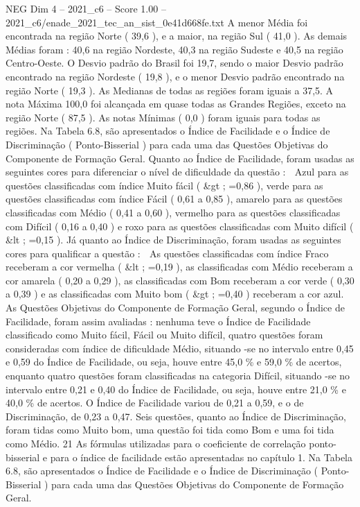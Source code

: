 \begin{textsample}{NEG Dim 4 – 2021\_c6 – Score 1.00 – 2021\_c6/enade\_2021\_tec\_an\_sist\_0e41d668fe.txt}
A menor Média foi encontrada na região Norte ( 39,6 ), e a maior, na região Sul ( 41,0 ).
As demais Médias foram : 40,6 na região Nordeste, 40,3 na região Sudeste e 40,5 na região Centro-Oeste.
O Desvio padrão do Brasil foi 19,7, sendo o maior Desvio padrão encontrado na região Nordeste ( 19,8 ), e o menor Desvio padrão encontrado na região Norte ( 19,3 ).
As Medianas de todas as regiões foram iguais a 37,5.
A nota Máxima 100,0 foi alcançada em quase todas as Grandes Regiões, exceto na região Norte ( 87,5 ).
As notas Mínimas ( 0,0 ) foram iguais para todas as regiões.
Na Tabela 6.8, são apresentados o Índice de Facilidade e o Índice de Discriminação ( Ponto-Bisserial ) para cada uma das Questões Objetivas do Componente de Formação Geral.
Quanto ao Índice de Facilidade, foram usadas as seguintes cores para diferenciar o nível de dificuldade da questão :  Azul para as questões classificadas com índice Muito fácil ( \&gt ; =0,86 ), verde para as questões classificadas com índice Fácil ( 0,61 a 0,85 ), amarelo para as questões classificadas com Médio ( 0,41 a 0,60 ), vermelho para as questões classificadas com Difícil ( 0,16 a 0,40 ) e roxo para as questões classificadas com Muito difícil ( \&lt ; =0,15 ).
Já quanto ao Índice de Discriminação, foram usadas as seguintes cores para qualificar a questão :  As questões classificadas com índice Fraco receberam a cor vermelha ( \&lt ; =0,19 ), as classificadas com Médio receberam a cor amarela ( 0,20 a 0,29 ), as classificadas com Bom receberam a cor verde ( 0,30 a 0,39 ) e as classificadas com Muito bom ( \&gt ; =0,40 ) receberam a cor azul.
As Questões Objetivas do Componente de Formação Geral, segundo o Índice de Facilidade, foram assim avaliadas : nenhuma teve o Índice de Facilidade classificado como Muito fácil, Fácil ou Muito difícil, quatro questões foram consideradas com índice de dificuldade Médio, situando -se no intervalo entre 0,45 e 0,59 do Índice de Facilidade, ou seja, houve entre 45,0 \% e 59,0 \% de acertos, enquanto quatro questões foram classificadas na categoria Difícil, situando -se no intervalo entre 0,21 e 0,40 do Índice de Facilidade, ou seja, houve entre 21,0 \% e 40,0 \% de acertos.
O Índice de Facilidade variou de 0,21 a 0,59, e o de Discriminação, de 0,23 a 0,47.
Seis questões, quanto ao Índice de Discriminação, foram tidas como Muito bom, uma questão foi tida como Bom e uma foi tida como Médio. 21 As fórmulas utilizadas para o coeficiente de correlação ponto-bisserial e para o índice de facilidade estão apresentadas no capítulo 1.
Na Tabela 6.8, são apresentados o Índice de Facilidade e o Índice de Discriminação ( Ponto-Bisserial ) para cada uma das Questões Objetivas do Componente de Formação Geral.

\end{textsample}
